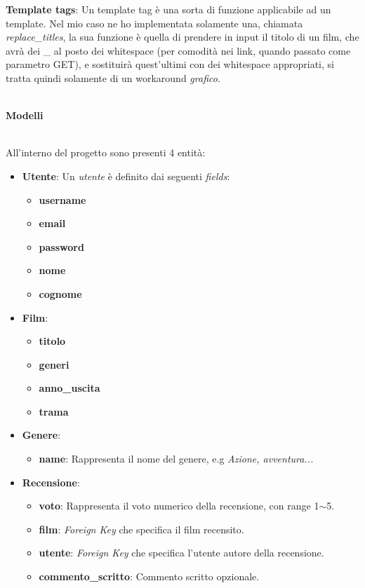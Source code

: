 \documentclass[12pt]{article}
\begin{document}
	\noindent \textbf{Template tags}: Un template tag è una sorta di funzione applicabile ad un template. Nel mio caso ne ho implementata solamente una, chiamata \textit{replace\_titles}, la sua funzione è quella di prendere in input il titolo di un film, che avrà dei \_ al posto dei whitespace (per comodità nei link, quando passato come parametro GET), e sostituirà quest'ultimi con dei whitespace appropriati, si tratta quindi solamente di un workaround \textit{grafico}. \\ \\
	
	\pagebreak
	\noindent \centerline {\Huge \textbf{Modelli}} \\
	
	\noindent All'interno del progetto sono presenti 4 entità:
	
	\begin{itemize}
		\item \textbf{Utente}: Un \textit{utente} è definito dai seguenti \textit{fields}:
		\begin{itemize}
			\item \textbf{username}
			\item \textbf{email}
			\item \textbf{password}
			\item \textbf{nome}
			\item \textbf{cognome} \\
		\end{itemize}
		
		\item \textbf{Film}:
		\begin{itemize}
			\item \textbf{titolo}
			\item \textbf{generi}
			\item \textbf{anno\_uscita}
			\item \textbf{trama} \\
		\end{itemize}
		
		
		\item \textbf{Genere}:
		\begin{itemize}
			\item \textbf{name}: Rappresenta il nome del genere, e.g \textit{Azione, avventura...} \\
		\end{itemize}
		
		
		
		\item \textbf{Recensione}:
		\begin{itemize}
			\item \textbf{voto}: Rappresenta il voto numerico della recensione, con range 1$\sim$5.
			\item \textbf{film}: \textit{Foreign Key} che specifica il film recensito.
			\item \textbf{utente}: \textit{Foreign Key} che specifica l'utente autore della recensione.
			\item \textbf{commento\_scritto}: Commento scritto opzionale.
		\end{itemize}
	\end{itemize}
	\pagebreak
	
\end{document}
